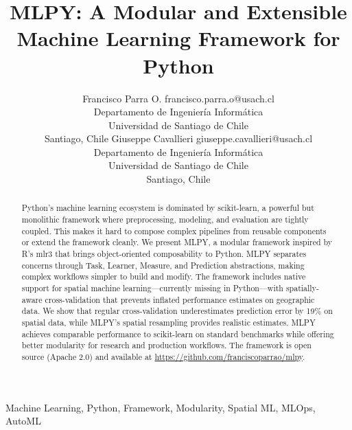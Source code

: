 \documentclass[twoside,11pt]{article}
\begin{document}
\title{MLPY: A Modular and Extensible Machine Learning Framework for Python}

\author{\name Francisco Parra O. \email francisco.parra.o@usach.cl \\
       \addr Departamento de Ingeniería Informática\\
       Universidad de Santiago de Chile\\
       Santiago, Chile
       \AND
       \name Giuseppe Cavallieri \email giuseppe.cavallieri@usach.cl \\
       \addr Departamento de Ingeniería Informática\\
       Universidad de Santiago de Chile\\
       Santiago, Chile}


\maketitle

\begin{abstract}
Python's machine learning ecosystem is dominated by scikit-learn, a powerful
but monolithic framework where preprocessing, modeling, and evaluation are
tightly coupled. This makes it hard to compose complex pipelines from reusable
components or extend the framework cleanly. We present MLPY, a modular framework
inspired by R's mlr3 that brings object-oriented composability to Python. MLPY
separates concerns through Task, Learner, Measure, and Prediction abstractions,
making complex workflows simpler to build and modify. The framework includes
native support for spatial machine learning---currently missing in Python---with
spatially-aware cross-validation that prevents inflated performance estimates
on geographic data. We show that regular cross-validation underestimates
prediction error by 19\% on spatial data, while MLPY's spatial resampling
provides realistic estimates. MLPY achieves comparable performance to scikit-learn
on standard benchmarks while offering better modularity for research and
production workflows. The framework is open source (Apache 2.0) and available
at \url{https://github.com/franciscoparrao/mlpy}.
\end{abstract}

\begin{keywords}
  Machine Learning, Python, Framework, Modularity, Spatial ML, MLOps, AutoML
\end{keywords}
\end{document}
